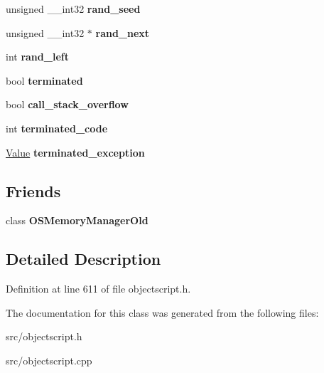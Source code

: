\begin{DoxyCompactItemize}
\item 
unsigned \+\_\+\+\_\+int32 {\bfseries rand\+\_\+seed}\hypertarget{class_object_script_1_1_o_s_1_1_core_a44fcbb2d385acf09271fb77eab7b095c}{}\label{class_object_script_1_1_o_s_1_1_core_a44fcbb2d385acf09271fb77eab7b095c}

\item 
unsigned \+\_\+\+\_\+int32 $\ast$ {\bfseries rand\+\_\+next}\hypertarget{class_object_script_1_1_o_s_1_1_core_a84ad2a71c2832fae99c97aaed30a6c13}{}\label{class_object_script_1_1_o_s_1_1_core_a84ad2a71c2832fae99c97aaed30a6c13}

\item 
int {\bfseries rand\+\_\+left}\hypertarget{class_object_script_1_1_o_s_1_1_core_add4939aab6f5c48ead8f8653218b2fae}{}\label{class_object_script_1_1_o_s_1_1_core_add4939aab6f5c48ead8f8653218b2fae}

\item 
bool {\bfseries terminated}\hypertarget{class_object_script_1_1_o_s_1_1_core_ac5f6b6f60e425afb2132e6014460c4ab}{}\label{class_object_script_1_1_o_s_1_1_core_ac5f6b6f60e425afb2132e6014460c4ab}

\item 
bool {\bfseries call\+\_\+stack\+\_\+overflow}\hypertarget{class_object_script_1_1_o_s_1_1_core_afdbca0475feae2bed804408fbb1c0375}{}\label{class_object_script_1_1_o_s_1_1_core_afdbca0475feae2bed804408fbb1c0375}

\item 
int {\bfseries terminated\+\_\+code}\hypertarget{class_object_script_1_1_o_s_1_1_core_a79cfa9d31a49cf80af18217739307dad}{}\label{class_object_script_1_1_o_s_1_1_core_a79cfa9d31a49cf80af18217739307dad}

\item 
\hyperlink{struct_object_script_1_1_o_s_1_1_core_1_1_value}{Value} {\bfseries terminated\+\_\+exception}\hypertarget{class_object_script_1_1_o_s_1_1_core_ac395d45570b599b6b2816887855825aa}{}\label{class_object_script_1_1_o_s_1_1_core_ac395d45570b599b6b2816887855825aa}

\end{DoxyCompactItemize}
\subsection*{Friends}
\begin{DoxyCompactItemize}
\item 
class {\bfseries O\+S\+Memory\+Manager\+Old}\hypertarget{class_object_script_1_1_o_s_1_1_core_a4d7939ded2fbcb95a031096912122ef0}{}\label{class_object_script_1_1_o_s_1_1_core_a4d7939ded2fbcb95a031096912122ef0}

\end{DoxyCompactItemize}


\subsection{Detailed Description}


Definition at line 611 of file objectscript.\+h.



The documentation for this class was generated from the following files\+:\begin{DoxyCompactItemize}
\item 
src/objectscript.\+h\item 
src/objectscript.\+cpp\end{DoxyCompactItemize}
